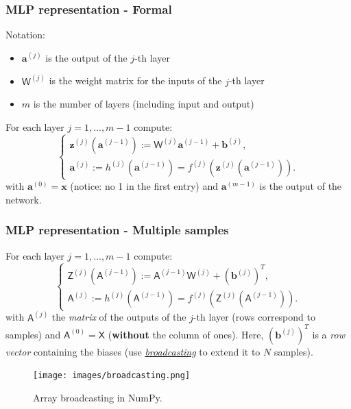\documentclass{beamer}
\begin{document}
	\begin{frame}
		\frametitle{MLP representation - Formal}
		Notation: 
		\begin{itemize}
			\item $\bm{a}^{(j)}$ is the output of the $j$-th layer
			\item $\mathsf{W}^{(j)}$ is the weight matrix for the inputs of the $j$-th layer
			\item $m$ is the number of layers (including input and output)
		\end{itemize}
				
		\vspace{5mm}
				
		For each layer $j = 1, \dots, m-1$ compute:
		\begin{equation*}
			\begin{cases}
				\bm{z}^{(j)}(\bm{a}^{(j-1)}) := \mathsf{W}^{(j)} \bm{a}^{(j-1)} + \bm{b}^{(j)},\\
				\bm{a}^{(j)} := h^{(j)}(\bm{a}^{(j-1)}) = f^{(j)}(\bm{z}^{(j)}(\bm{a}^{(j-1)})).
			\end{cases}
		\end{equation*}
		with 
		$\bm{a}^{(0)} = \bm{x}$ (notice: no 1 in the first entry) and $\bm{a}^{(m-1)}$ is the output of the network.

	\end{frame}

	\begin{frame}
		\frametitle{MLP representation - Multiple samples}
		For each layer $j = 1, \dots, m-1$ compute:
		\begin{equation*}
			\begin{cases}
				\mathsf{Z}^{(j)}(\mathsf{A}^{(j-1)}) := \mathsf{A}^{(j-1)}\mathsf{W}^{(j)}  + (\bm{b}^{(j)})^T,\\
				\mathsf{A}^{(j)} := h^{(j)}(\mathsf{A}^{(j-1)}) = f^{(j)}(\mathsf{Z}^{(j)}(\mathsf{A}^{(j-1)})).
			\end{cases}
		\end{equation*}
		with $\mathsf{A}^{(j)}$ the \textit{matrix} of the outputs of the $j$-th layer (rows correspond to samples) and $\mathsf{A}^{(0)} = \mathsf{X}$ (\textbf{without} the column of ones). Here, $(\bm{b}^{(j)})^T$ is a \textit{row vector} containing the biases (use \href{https://numpy.org/doc/stable/user/basics.broadcasting.html}{\textit{broadcasting}} to extend it to $N$ samples).
		
		\begin{figure}
			\centering
			\texttt{[image: images/broadcasting.png]}
			\caption{Array broadcasting in NumPy.}
			\label{fig:broadcasting}
		\end{figure}
		
	\end{frame}
\end{document}
